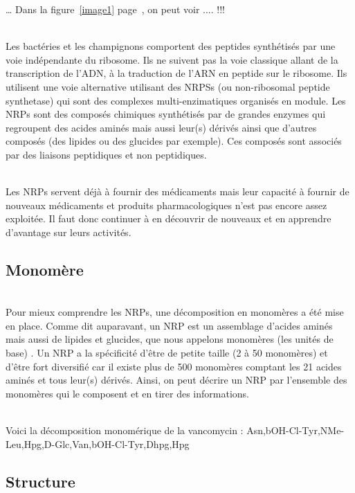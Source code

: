 \documentclass[a4paper,10pt]{report}
\begin{document}
	
    
            
      …
      Dans la figure~\ref{image1} page~\pageref{image1}, on peut voir .... !!! 
 
      
	~\\ 
	Les bactéries et les champignons comportent des peptides synthétisés par une voie indépendante du ribosome. 
	Ils ne suivent pas la voie classique allant de la transcription de l'ADN, à la traduction de l'ARN en peptide sur le ribosome.
	Ils utilisent une voie alternative utilisant des NRPSs (ou non-ribosomal peptide synthetase) qui sont des complexes multi-enzimatiques organisés en module.
	Les NRPs sont des composés chimiques synthétisés par de grandes enzymes qui regroupent des acides aminés mais aussi leur(s) dérivés ainsi que d'autres composés (des lipides ou des glucides par exemple). Ces composés sont associés par des liaisons peptidiques et non peptidiques. 
	
	\\Les NRPs servent déjà à fournir des médicaments mais leur capacité à fournir de nouveaux médicaments et produits pharmacologiques n'est pas encore assez exploitée. Il faut donc continuer à en découvrir de nouveaux et en apprendre d'avantage sur leurs activités.

      \subsection{Monomère}
	
	~~\\Pour mieux comprendre les NRPs, une décomposition en monomères a été mise en place. 
	Comme dit auparavant, un NRP est un assemblage d'acides aminés mais aussi de lipides et glucides, que nous  appelons monomères (les unités de base) . 
	Un NRP a la spécificité d'être de petite taille (2 à 50 monomères) et d'être fort diversifié car il existe plus de 500 monomères comptant les 21 acides aminés et tous leur(s) dérivés.
	Ainsi, on peut décrire un NRP par l'ensemble des monomères qui le composent et en tirer des informations. 
	
	\\Voici la décomposition monomérique de la vancomycin : Asn,bOH-Cl-Tyr,NMe-Leu,Hpg,D-Glc,Van,bOH-Cl-Tyr,Dhpg,Hpg
	
      \subsection{Structure}
	
\end{document}
